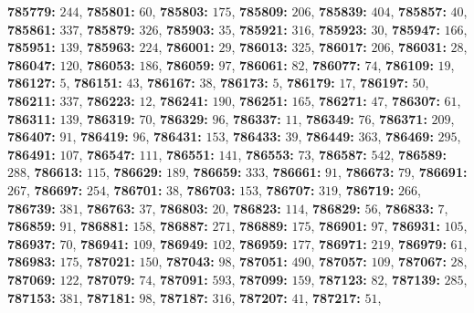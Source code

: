 \textsf{\bfseries 785779:} $244$, \textsf{\bfseries 785801:} $60$, \textsf{\bfseries 785803:} $175$, \textsf{\bfseries 785809:} $206$, \textsf{\bfseries 785839:} $404$, \textsf{\bfseries 785857:} $40$, \textsf{\bfseries 785861:} $337$, \textsf{\bfseries 785879:} $326$, \textsf{\bfseries 785903:} $35$, \textsf{\bfseries 785921:} $316$, \textsf{\bfseries 785923:} $30$, \textsf{\bfseries 785947:} $166$, \textsf{\bfseries 785951:} $139$, \textsf{\bfseries 785963:} $224$, \textsf{\bfseries 786001:} $29$, \textsf{\bfseries 786013:} $325$, \textsf{\bfseries 786017:} $206$, \textsf{\bfseries 786031:} $28$, \textsf{\bfseries 786047:} $120$, \textsf{\bfseries 786053:} $186$, \textsf{\bfseries 786059:} $97$, \textsf{\bfseries 786061:} $82$, \textsf{\bfseries 786077:} $74$, \textsf{\bfseries 786109:} $19$, \textsf{\bfseries 786127:} $5$, \textsf{\bfseries 786151:} $43$, \textsf{\bfseries 786167:} $38$, \textsf{\bfseries 786173:} $5$, \textsf{\bfseries 786179:} $17$, \textsf{\bfseries 786197:} $50$, \textsf{\bfseries 786211:} $337$, \textsf{\bfseries 786223:} $12$, \textsf{\bfseries 786241:} $190$, \textsf{\bfseries 786251:} $165$, \textsf{\bfseries 786271:} $47$, \textsf{\bfseries 786307:} $61$, \textsf{\bfseries 786311:} $139$, \textsf{\bfseries 786319:} $70$, \textsf{\bfseries 786329:} $96$, \textsf{\bfseries 786337:} $11$, \textsf{\bfseries 786349:} $76$, \textsf{\bfseries 786371:} $209$, \textsf{\bfseries 786407:} $91$, \textsf{\bfseries 786419:} $96$, \textsf{\bfseries 786431:} $153$, \textsf{\bfseries 786433:} $39$, \textsf{\bfseries 786449:} $363$, \textsf{\bfseries 786469:} $295$, \textsf{\bfseries 786491:} $107$, \textsf{\bfseries 786547:} $111$, \textsf{\bfseries 786551:} $141$, \textsf{\bfseries 786553:} $73$, \textsf{\bfseries 786587:} $542$, \textsf{\bfseries 786589:} $288$, \textsf{\bfseries 786613:} $115$, \textsf{\bfseries 786629:} $189$, \textsf{\bfseries 786659:} $333$, \textsf{\bfseries 786661:} $91$, \textsf{\bfseries 786673:} $79$, \textsf{\bfseries 786691:} $267$, \textsf{\bfseries 786697:} $254$, \textsf{\bfseries 786701:} $38$, \textsf{\bfseries 786703:} $153$, \textsf{\bfseries 786707:} $319$, \textsf{\bfseries 786719:} $266$, \textsf{\bfseries 786739:} $381$, \textsf{\bfseries 786763:} $37$, \textsf{\bfseries 786803:} $20$, \textsf{\bfseries 786823:} $114$, \textsf{\bfseries 786829:} $56$, \textsf{\bfseries 786833:} $7$, \textsf{\bfseries 786859:} $91$, \textsf{\bfseries 786881:} $158$, \textsf{\bfseries 786887:} $271$, \textsf{\bfseries 786889:} $175$, \textsf{\bfseries 786901:} $97$, \textsf{\bfseries 786931:} $105$, \textsf{\bfseries 786937:} $70$, \textsf{\bfseries 786941:} $109$, \textsf{\bfseries 786949:} $102$, \textsf{\bfseries 786959:} $177$, \textsf{\bfseries 786971:} $219$, \textsf{\bfseries 786979:} $61$, \textsf{\bfseries 786983:} $175$, \textsf{\bfseries 787021:} $150$, \textsf{\bfseries 787043:} $98$, \textsf{\bfseries 787051:} $490$, \textsf{\bfseries 787057:} $109$, \textsf{\bfseries 787067:} $28$, \textsf{\bfseries 787069:} $122$, \textsf{\bfseries 787079:} $74$, \textsf{\bfseries 787091:} $593$, \textsf{\bfseries 787099:} $159$, \textsf{\bfseries 787123:} $82$, \textsf{\bfseries 787139:} $285$, \textsf{\bfseries 787153:} $381$, \textsf{\bfseries 787181:} $98$, \textsf{\bfseries 787187:} $316$, \textsf{\bfseries 787207:} $41$, \textsf{\bfseries 787217:} $51$, 
